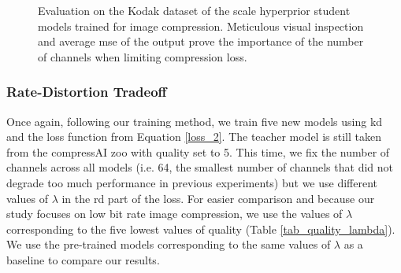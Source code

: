 \begin{figure}[H]
    \centering
    \qquad
    \caption[Evaluation on the Kodak dataset of the scale hyperprior student models trained for image compression.]{Evaluation on the Kodak dataset of the scale hyperprior student models trained for image compression. Meticulous visual inspection and average \acrshort{mse} of the output prove the importance of the number of channels when limiting compression loss.}
    \label{kd_lic_2}
\end{figure}

\subsubsection{Rate-Distortion Tradeoff}
Once again, following our training method, we train five new models using \acrshort{kd} and the loss function from Equation \ref{loss_2}. The teacher model is still taken from the compressAI zoo with \textsf{quality} set to 5. This time, we fix the number of channels across all models (i.e. 64, the smallest number of channels that did not degrade too much performance in previous experiments) but we use different values of \(\lambda\) in the \acrshort{rd} part of the loss. For easier comparison and because our study focuses on low bit rate image compression, we use the values of \(\lambda\) corresponding to the five lowest values of \textsf{quality} (Table \ref{tab_quality_lambda}). We use the pre-trained models corresponding to the same values of \(\lambda\) as a baseline to compare our results.

